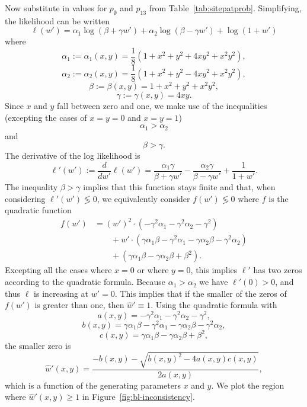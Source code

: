 Now substitute in values for $p_{\emptyset}$ and $p_{13}$ from Table~\ref{tab:sitepatprob}.
Simplifying, the likelihood can be written
$$
\ell(w') = \alpha_1\log(\beta+\gamma w') + \alpha_2\log(\beta-\gamma w') + \log(1+w')
$$
where
$$
\alpha_1 := \alpha_1(x, y) = \frac{1}{8} (1+x^2+y^2+4xy^2+x^2y^2),
$$
$$
\alpha_2 := \alpha_2(x, y) = \frac{1}{8}(1+x^2+y^2-4xy^2+x^2y^2),
$$
$$
\beta := \beta(x, y) = 1+x^2+y^2+x^2y^2,
$$
$$
\gamma := \gamma(x, y) = 4xy.
$$
Since $x$ and $y$ fall between zero and one, we make use of the inequalities (excepting the cases of $x=y=0$ and $x=y=1$)
$$
\alpha_1 > \alpha_2
$$
and
$$
\beta > \gamma.
$$
The derivative of the log likelihood is
$$
\ell'(w') := \frac{d}{dw'} \ell(w') = \frac{\alpha_1 \gamma}{\beta+\gamma w'} - \frac{\alpha_2 \gamma}{\beta-\gamma w'} + \frac{1}{1+w'}.
$$
The inequality $\beta > \gamma$ implies that this function stays finite and that, when considering $\ell'(w') \lessgtr 0$, we equivalently consider $f(w') \lessgtr 0$ where $f$ is the quadratic function
\begin{align*}
f(w') &= (w')^2\cdot(-\gamma^2\alpha_1-\gamma^2\alpha_2-\gamma^2) \\
      &\qquad + w'\cdot(\gamma\alpha_1\beta-\gamma^2\alpha_1-\gamma\alpha_2\beta-\gamma^2\alpha_2) \\
      &\qquad + (\gamma\alpha_1\beta-\gamma\alpha_2\beta+\beta^2).
\end{align*}
Excepting all the cases where $x=0$ or where $y=0$, this implies $\ell'$ has two zeros according to the quadratic formula.
Because $\alpha_1 > \alpha_2$ we have $\ell'(0) > 0$, and thus $\ell$ is increasing at $w'=0$.
This implies that if the smaller of the zeros of $f(w')$ is greater than one, then $\hat{w}' \equiv 1$.
Using the quadratic formula with
$$
a(x, y) = -\gamma^2 \alpha_1 - \gamma^2 \alpha_2 - \gamma^2,
$$
$$
b(x, y) = \gamma \alpha_1 \beta - \gamma^2\alpha_1 - \gamma \alpha_2 \beta - \gamma^2 \alpha_2,
$$
$$
c(x, y) = \gamma \alpha_1 \beta - \gamma \alpha_2 \beta + \beta^2,
$$
the smaller zero is
$$
\hat{w}'(x, y) = \frac{-b(x, y) - \sqrt{b(x, y)^2 - 4a(x, y)c(x, y)}}{2a(x, y)},
$$
which is a function of the generating parameters $x$ and $y$.
We plot the region where $\hat{w}'(x, y) \ge 1$ in Figure~\ref{fig:bl-inconsistency}.

